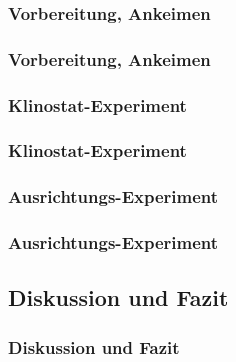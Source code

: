 \documentclass[11pt, aspectratio=169]{beamer}
\begin{document}
	\subsubsection{Vorbereitung, Ankeimen}
	
	\begin{frame}
		\frametitle{Vorbereitung, Ankeimen}
	\end{frame}
	
	\subsubsection{Klinostat-Experiment}
	
	\begin{frame}
		\frametitle{Klinostat-Experiment}
	\end{frame}
	
	\subsubsection{Ausrichtungs-Experiment}
	
	\begin{frame}
		\frametitle{Ausrichtungs-Experiment}
	\end{frame}
	
	\subsection{Diskussion und Fazit}
	
	\begin{frame}
		\frametitle{Diskussion und Fazit}
	\end{frame}
\end{document}
